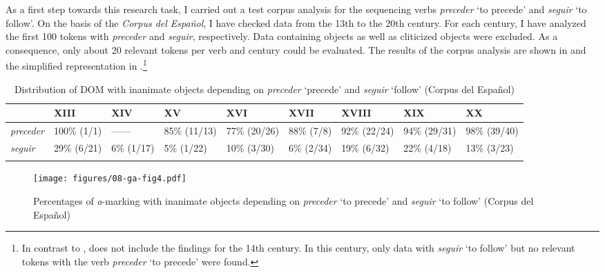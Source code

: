 \documentclass[output=paper]{LSP/langsci}
\begin{document}
As a first step towards this research task, I carried out a test corpus analysis for the sequencing verbs \textit{preceder} ‘to precede’ and \textit{seguir} ‘to follow’. On the basis of the \textit{Corpus del Español}, I have checked data from the 13th to the 20th century. For each century, I have analyzed the first 100 tokens with \textit{preceder} and \textit{seguir}, respectively. Data containing  objects as well as cliticized objects were excluded. As a consequence, only about 20 relevant tokens per verb and century could be evaluated. The results of the corpus analysis are shown in  and the simplified representation in .\footnote{In contrast to ,  does not include the findings for the 14th century. In this century, only data with \textit{seguir} ‘to follow’ but no relevant tokens with the verb \textit{preceder} ‘to precede’ were found.} 


\begin{table}
\begin{tabularx}{\textwidth}{XXXXXXXXX} 
\lsptoprule
& XIII & XIV & XV & XVI & XVII & XVIII & XIX & XX\\
\midrule
{\itshape preceder} & 100\% (1/1) &------ & 85\% (11/13) & 77\% (20/26) & 88\% (7/8) & 92\% (22/24) & 94\% (29/31) & 98\% (39/40)\\
{\itshape seguir} & 29\% (6/21) & 6\% (1/17) & 5\% (1/22) & 10\% (3/30) & 6\% (2/34) & 19\% (6/32) & 22\% (4/18) & 13\% (3/23)\\

\lspbottomrule
\end{tabularx}
\caption{ Distribution of DOM with inanimate objects depending on \textit{preceder} ‘precede’ and \textit{seguir} ‘follow’ (Corpus del Español)}\label{08-ga-tab:9}
\end{table}


\begin{figure}
\texttt{[image: figures/08-ga-fig4.pdf]}
\caption{Percentages of \textit{a}-marking with inanimate objects depending on \textit{preceder} ‘to precede’ and \textit{seguir} ‘to follow’ (Corpus del Español)}\label{08-ga-fig:4}
\end{figure}
\end{document}
